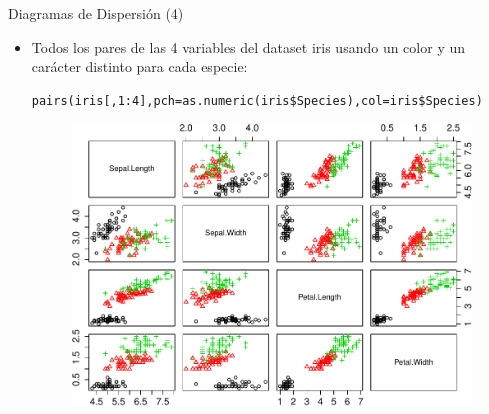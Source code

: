 \documentclass[handout]{beamer}
\begin{document}
\begin{frame}[fragile]{Diagramas de Dispersión (4)}
\scriptsize{
\begin{itemize}
 \item Todos los pares de las 4 variables del dataset iris usando un color y un carácter distinto para cada especie:
 \begin{verbatim}
pairs(iris[,1:4],pch=as.numeric(iris$Species),col=iris$Species)
 \end{verbatim}

  \begin{figure}[h!]
	\centering
	\includegraphics[scale=0.5]{pics/scatter2.pdf}		
\end{figure} 
 
 
\end{itemize}

}
 
\end{frame}
\end{document}
